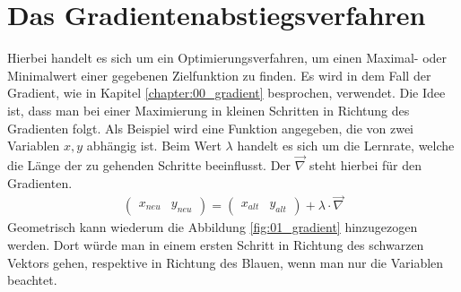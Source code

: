 \section{Das Gradientenabstiegsverfahren}\label{chapter:01_gradientenabstiegsverfahren}
Hierbei handelt es sich um ein Optimierungsverfahren, um einen Maximal- oder Minimalwert einer gegebenen Zielfunktion
zu finden. Es wird in dem Fall der Gradient, wie in Kapitel \ref{chapter:00_gradient} besprochen, verwendet. Die Idee
ist, dass man bei einer Maximierung in kleinen Schritten in Richtung des Gradienten folgt. Als Beispiel wird eine
Funktion angegeben, die von zwei Variablen $x, y$ abhängig ist. Beim Wert $\lambda$ handelt es sich um die Lernrate, welche
die Länge der zu gehenden Schritte beeinflusst. Der $\vec{\nabla}$ steht hierbei für den Gradienten.
\begin{align}
    \begin{pmatrix}x_{neu} & y_{neu}\end{pmatrix} = \begin{pmatrix}x_{alt} & y_{alt}\end{pmatrix} + \lambda \cdot \vec{\nabla}
\end{align}
Geometrisch kann wiederum die Abbildung \ref{fig:01_gradient} hinzugezogen werden. Dort würde man in einem ersten Schritt
in Richtung des schwarzen Vektors gehen, respektive in Richtung des Blauen, wenn man nur die Variablen beachtet.